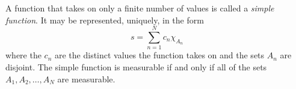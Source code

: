 A function that takes on only a finite number of values is called a \textit{simple function}. It may be represented, uniquely, in the form
$$s = \sum_{n=1}^{N} c_n \chi_{A_n}$$
where the $c_n$ are the distinct values the function takes on and the sets $A_n$ are disjoint. The simple function is measurable if and only if all of the sets $A_1, A_2, \ldots, A_N$ are measurable.
